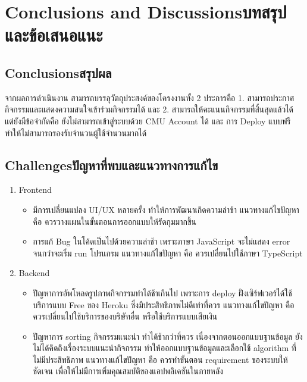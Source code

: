 \chapter{\ifenglish Conclusions and Discussions\else บทสรุปและข้อเสนอแนะ\fi}

\section{\ifenglish Conclusions\else สรุปผล\fi}

จากผลการดำเนินงาน สามารถบรรลุวัตถุประสงค์ของโครงงานทั้ง 2 ประการคือ 1. สามารถประกาศกิจกรรมและแสดงความสนใจเข้าร่วมกิจกรรมได้ และ
2. สามารถให้คะแนนกิจกรรมที่สิ้นสุดแล้วได้ แต่ยังมีข้อจำกัดคือ ยังไม่สามารถเข้าสู่ระบบด้วย CMU Account ได้ และ การ Deploy แบบฟรี ทำให้ไม่สามารถรองรับจำนวนผู้ใช้จำนวนมากได้

\section{\ifenglish Challenges\else ปัญหาที่พบและแนวทางการแก้ไข\fi}

\begin{enumerate}
    \item Frontend
    \begin{itemize}
        \item มีการเปลี่ยนแปลง UI/UX หลายครั้ง ทำให้การพัฒนาเกิดความล่าช้า แนวทางแก้ไขปัญหา คือ ควรวางแผนในขั้นตอนการออกแบบให้รัดกุมมากขึ้น
        \item การแก้ Bug ในโค้ดเป็นไปด้วยความล่าช้า เพราะภาษา JavaScript จะไม่แสดง error จนกว่าจะเริ่ม run โปรแกรม แนวทางแก้ไขปัญหา คือ ควรเปลี่ยนไปใช้ภาษา TypeScript
    \end{itemize}
    \item Backend
    \begin{itemize}
        \item ปัญหาการอัพโหลดรูปภาพกิจกรรมทำได้ช้าเกินไป เพราะการ deploy ฝั่งเซิร์ฟเวอร์ได้ใช้บริการแบบ Free ของ Heroku ซึ่งมีประสิทธิภาพไม่ดีเท่าที่ควร แนวทางแก้ไขปัญหา คือ ควรเปลี่ยนไปใช้บริการของบริษัทอื่น หรือใช้บริการแบบเสียเงิน
        \item ปัญหาการ sorting กิจกรรมแนะนำ ทำได้ช้ากว่าที่ควร เนื่องจากตอนออกแบบฐานข้อมูล ยังไม่ได้คิดถึงเรื่องระบบแนะนำกิจกรรม ทำให้ออกแบบฐานข้อมูลและเลือกใช้ algorithm ที่ไม่มีประสิทธิภาพ แนวทางแก้ไขปัญหา คือ ควรทำขั้นตอน requirement ของระบบให้ชัดเจน เพื่อให้ไม่มีการเพิ่มคุณสมบัติของแอปพลิเคชันในภายหลัง
    \end{itemize}
\end{enumerate}

